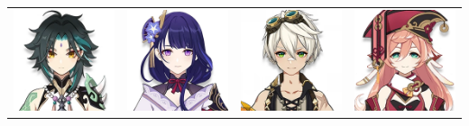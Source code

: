 \documentclass[11pt]{article}
\begin{document}
\begin{center}
    \begin{tabular}{m{} m{} m{} m{}}
        \includegraphics[scale = 0.25]{Character_Xiao.png}  & \includegraphics[scale = 0.25]{Character_Raiden_Shogun.png} &  \includegraphics[scale = 0.25]{Character_Bennett.png} & \includegraphics[scale = 0.25]{Character_Yanfei.png}\\
    \end{tabular}
\end{center} 
\end{document}
